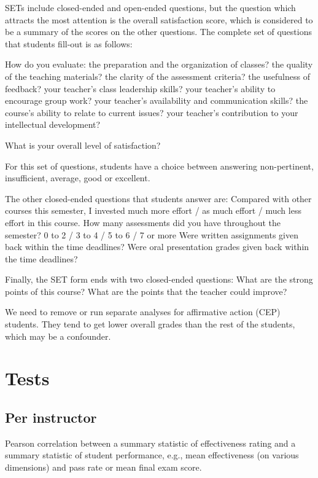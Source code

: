 \documentclass[12pt]{article}
\newcommand{\todo}[1]{{\color{red}{TO DO: \sc #1}}}
\begin{document}
SETs include closed-ended and open-ended questions, but the question which attracts the most attention is the overall 
satisfaction score, which is considered to be a summary of the scores on the other questions. The complete set of questions 
that students fill-out is as follows:

How do you evaluate:
the preparation and the organization of classes?    
the quality of the teaching materials?
the clarity of the assessment criteria?
the usefulness of feedback?
your teacher's class leadership skills?
your teacher's ability to encourage group work? 
your teacher's availability and communication skills?
the course's ability to relate to current issues?
your teacher's contribution to your intellectual development?

What is your overall level of satisfaction?

For this set of questions, students have a choice between answering non-pertinent, insufficient, average, good or excellent.

The other closed-ended questions that students answer are:
Compared with other courses this semester, I invested much more effort / as much effort / much less effort in this course. 
How many assessments did you have throughout the semester? 0 to 2 / 3 to 4 / 5 to 6 / 7 or more
Were written assignments given back within the time deadlines?
Were oral presentation grades given back within the time deadlines? 

Finally, the SET form ends with two closed-ended questions: 
What are the strong points of this course? 
What are the points that the teacher could improve?      


We need to remove or run separate analyses for affirmative action (CEP) students. They tend to get lower overall 
grades than the rest of the students, which may be a confounder.

\section{Tests}

\subsection{Per instructor}
Pearson correlation between a summary statistic of effectiveness rating and a summary statistic
of student performance, e.g., mean effectiveness (on various dimensions) and pass rate or mean
final exam score.
\todo{code is ready.  Do we do all metrics?}
\end{document}
